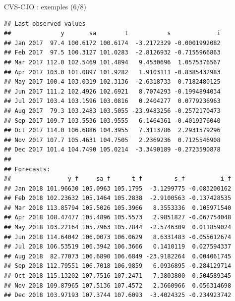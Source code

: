 \documentclass[10pt,xcolor=table,color={dvipsnames,usenames},ignorenonframetext,usepdftitle=false,french]{beamer}
\newenvironment{Shaded}{\begin{snugshade}}{\end{snugshade}}
\newcommand{\NormalTok}[1]{#1}
\newcommand{\OperatorTok}[1]{\textcolor[rgb]{0.81,0.36,0.00}{\textbf{#1}}}
\begin{document}
\begin{frame}[fragile]{CVS-CJO : exemples (6/8)}
\protect\hypertarget{cvs-cjo-exemples-68}{}

\footnotesize

\begin{Shaded}
\end{Shaded}

\begin{verbatim}
## Last observed values
##              y       sa        t           s             i
## Jan 2017  97.4 100.6172 100.6174  -3.2172329 -0.0001992082
## Feb 2017  97.5 100.3127 101.0283  -2.8126932 -0.7155966863
## Mar 2017 112.0 102.5469 101.4894   9.4530696  1.0575376567
## Apr 2017 103.0 101.0897 101.9282   1.9103111 -0.8385432983
## May 2017 100.4 103.0319 102.3136  -2.6318733  0.7182480125
## Jun 2017 111.2 102.4926 102.6921   8.7074293 -0.1994894034
## Jul 2017 103.4 103.1596 103.0816   0.2404277  0.0779236963
## Aug 2017  79.3 103.2483 103.5055 -23.9483256 -0.2572170473
## Sep 2017 109.7 103.5536 103.9555   6.1464361 -0.4019376040
## Oct 2017 114.0 106.6886 104.3955   7.3113786  2.2931579296
## Nov 2017 107.7 105.4631 104.7505   2.2369236  0.7125546908
## Dec 2017 101.4 104.7490 105.0214  -3.3490189 -0.2723590878
## 
## Forecasts:
##                y_f     sa_f      t_f         s_f          i_f
## Jan 2018 101.96630 105.0963 105.1795  -3.1299775 -0.083200162
## Feb 2018 102.23632 105.1464 105.2838  -2.9100563 -0.137428535
## Mar 2018 113.85794 105.5026 105.3966   8.3553336  0.105971540
## Apr 2018 108.47477 105.4896 105.5573   2.9851827 -0.067754048
## May 2018 103.22164 105.7963 105.7844  -2.5746309  0.011859024
## Jun 2018 114.64042 106.0073 106.0629   8.6331483 -0.055612674
## Jul 2018 106.53519 106.3942 106.3666   0.1410119  0.027594337
## Aug 2018  82.77073 106.6890 106.6849 -23.9182264  0.004061745
## Sep 2018 112.79551 106.7018 106.9859   6.0936895 -0.284129714
## Oct 2018 115.13202 107.7516 107.2471   7.3803800  0.504589345
## Nov 2018 109.87965 107.5136 107.4572   2.3660966  0.056314698
## Dec 2018 103.97193 107.3744 107.6093  -3.4024325 -0.234923742
\end{verbatim}

\end{frame}
\end{document}
